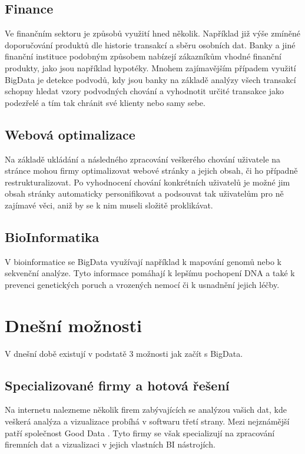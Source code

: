 \subsection{Finance}
Ve finančním sektoru je způsobů využití hned několik. Například již výše zmíněné doporučování produktů dle historie transakcí a sběru  osobních dat. Banky a jiné finanční instituce podobným způsobem nabízejí zákazníkům vhodné finanční produkty, jako jsou například hypotéky. Mnohem zajímavějším případem využití BigData je detekce podvodů, kdy jsou banky na základě analýzy všech transakcí schopny hledat vzory podvodných chování a vyhodnotit určité transakce jako podezřelé a tím tak chránit své klienty nebo samy sebe.

\subsection{Webová optimalizace}
Na základě ukládání a následného zpracování veškerého chování uživatele na stránce mohou firmy optimalizovat webové stránky a jejich obsah, či ho případně restrukturalizovat. Po vyhodnocení chování konkrétních uživatelů je možné jim obsah stránky automaticky personifikovat a podsouvat tak uživatelům pro ně zajímavé věci, aniž by se k nim museli složitě proklikávat.

\subsection{BioInformatika}
V bioinformatice se BigData využívají například k mapování genomů nebo k sekvenční analýze. Tyto informace pomáhají k lepšímu pochopení DNA a také k prevenci genetických poruch a vrozených nemocí či k usnadnění jejich léčby. \cite{industries} 

\section{Dnešní možnosti}
V dnešní době existují v podstatě 3 možnosti jak začít s BigData. 

\subsection{Specializované firmy a hotová řešení}
Na internetu nalezneme několik firem zabývajících se analýzou vašich dat, kde veškerá analýza a vizualizace probíhá v softwaru třetí strany. Mezi nejznámější patří společnost Good Data \cite{gooddata}. Tyto firmy se však specializují na zpracování firemních dat a vizualizaci v jejich vlastních BI nástrojích.

